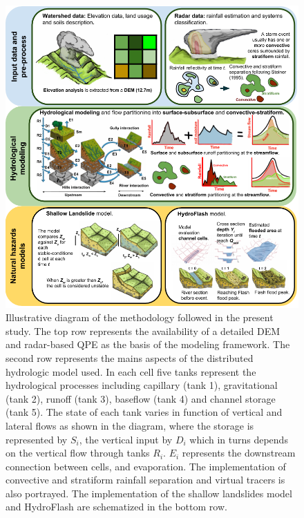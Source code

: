 \documentclass[hess, manuscript]{copernicus}
\begin{document}
\begin{figure}[t]
\centering
 \includegraphics[width=12cm]{Figures/Salgar_Esquema_v2.png}
 \caption{Illustrative diagram of the methodology followed in the present study. The top row represents the availability of a detailed DEM and  radar-based QPE as the basis of the modeling framework. The second row represents the mains aspects of the distributed hydrologic model used. In each cell five tanks represent the hydrological processes including capillary (tank 1), gravitational (tank 2), runoff (tank 3), baseflow (tank 4) and channel storage (tank 5).  The state of each tank varies in function of vertical and lateral flows as shown in the diagram, where the storage is represented by $S_i$, the vertical input by $D_i$ which in turns depends on the vertical flow through tanks $R_i$. $E_i$ represents the downstream connection between cells, and evaporation. The implementation of convective and stratiform rainfall separation and virtual tracers is also portrayed. The implementation of the shallow landslides model and HydroFlash are schematized in the bottom row.}
    \label{fig:EsquemaMetodologico}
\end{figure}



\end{document}
